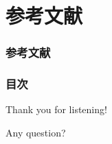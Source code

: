 \section*{参考文献}
\begin{frame}
  \frametitle{参考文献}

  
  \nocite{*}
  
\end{frame}

\begin{frame}
  \frametitle{目次}

  \tableofcontents[hideallsubsections]
\end{frame}

\begin{frame}
  \centering
  {\Huge Thank you for listening!}

  \quad \quad

  {\Huge Any question?}
\end{frame}


